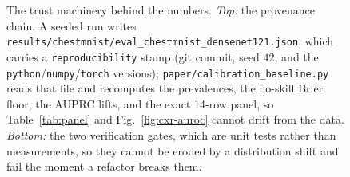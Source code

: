 \documentclass[conference]{IEEEtran}
\newcommand{\code}[1]{\texttt{\small #1}}
\begin{document}
\begin{figure}[t]
\caption{The trust machinery behind the numbers. \emph{Top:} the provenance chain.
A seeded run writes \code{results/chestmnist/eval\_chestmnist\_densenet121.json},
which carries a \code{reproducibility} stamp (git commit, seed $42$, and the
\texttt{python}/\texttt{numpy}/\texttt{torch} versions);
\code{paper/calibration\_baseline.py} reads that file and recomputes the
prevalences, the no-skill Brier floor, the AUPRC lifts, and the exact 14-row panel,
so Table~\ref{tab:panel} and Fig.~\ref{fig:cxr-auroc} cannot drift from the data.
\emph{Bottom:} the two verification gates, which are unit tests rather than
measurements, so they cannot be eroded by a distribution shift and fail the moment a
refactor breaks them.}
\label{fig:trustchain}
\end{figure}
\end{document}
